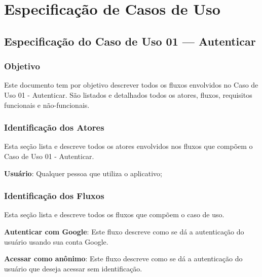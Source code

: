 \chapter{Especificação de Casos de Uso} \label{anexo:b}

\section*{Especificação do Caso de Uso 01 --- Autenticar}
\subsection*{Objetivo}
Este documento tem por objetivo descrever todos os fluxos envolvidos no Caso de Uso 01 - Autenticar. São listados e detalhados todos os atores, fluxos, requisitos funcionais e não-funcionais.

\subsection*{Identificação dos Atores}
Esta seção lista e descreve todos os atores envolvidos nos fluxos que compõem o Caso de Uso 01 - Autenticar.
\begin{lista}
  \item \textbf{Usuário}: Qualquer pessoa que utiliza o aplicativo;
\end{lista}

\subsection*{Identificação dos Fluxos}
Esta seção lista e descreve todos os fluxos que compõem o caso de uso.
\begin{lista}
  \item \textbf{Autenticar com Google}: Este fluxo descreve como se dá a autenticação do usuário usando sua conta Google.
  \item \textbf{Acessar como anônimo}: Este fluxo descreve como se dá a autenticação do usuário que deseja acessar sem identificação.
\end{lista}

